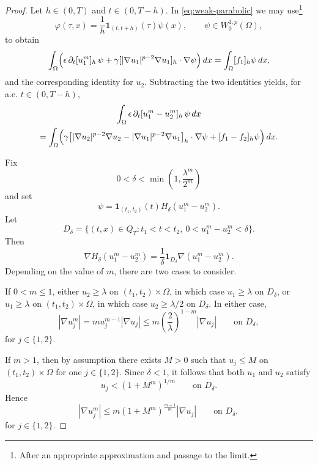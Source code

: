 \documentclass[a4paper,12pt]{article}
\theoremstyle{definition}
\theoremstyle{remark}
\begin{document}
\begin{proof}
Let $h\in(0,T)$ and $t\in(0,T-h)$. In \eqref{eq:weak-parabolic} we may use\footnote{After an appropriate approximation and passage to the limit.}
\[
\varphi(\tau,x)=\frac{1}{h}\mathbf{1}_{(t,t+h)}(\tau)\psi(x),
\qquad \psi\in W^{1,p}_0(\Omega),
\]
to obtain
\[
\int_\Omega\Bigl(\epsilon\,\partial_t[u_1^m]_h\,\psi+\gamma[|\nabla u_1|^{p-2}\nabla u_1]_h\cdot\nabla\psi\Bigr)\,dx
=\int_\Omega [f_1]_h\psi\,dx,
\]
and the corresponding identity for $u_2$. Subtracting the two identities yields, for a.e. $t\in(0,T-h)$,
\begin{multline}\label{eq:comparison-difference}
\int_\Omega\epsilon\,\partial_t[u_1^m-u_2^m]_h\,\psi\,dx\\
=\int_\Omega\Bigl(\gamma\bigl[|\nabla u_2|^{p-2}\nabla u_2-|\nabla u_1|^{p-2}\nabla u_1\bigr]_h\cdot\nabla\psi+[f_1-f_2]_h\psi\Bigr)\,dx.
\end{multline}

Fix
\[
0<\delta<\min\!\left(1,\frac{\lambda^m}{2^m}\right)
\]
and set
\[
\psi=\mathbf{1}_{(t_1,t_2)}(t)H_\delta(u_1^m-u_2^m).
\]
Let
\[
D_\delta=\{(t,x)\in Q_T:t_1<t<t_2,\ 0<u_1^m-u_2^m<\delta\}.
\]
Then
\[
\nabla H_\delta(u_1^m-u_2^m)=\frac{1}{\delta}\mathbf{1}_{D_\delta}\nabla(u_1^m-u_2^m).
\]
Depending on the value of $m$, there are two cases to consider.

If $0<m\le 1$, either $u_2\ge \lambda$ on $(t_1,t_2)\times\Omega$, in which case $u_1\ge \lambda$ on $D_\delta$, or $u_1\ge \lambda$ on $(t_1,t_2)\times\Omega$, in which case $u_2\ge \lambda/2$ on $D_\delta$. In either case,
\[
|\nabla u_j^m|=m u_j^{m-1}|\nabla u_j|\le m\left(\frac{2}{\lambda}\right)^{1-m}|\nabla u_j|
\qquad\text{on }D_\delta,
\]
for $j\in\{1,2\}$.

If $m>1$, then by assumption there exists $M>0$ such that $u_j\le M$ on $(t_1,t_2)\times\Omega$ for one $j\in\{1,2\}$. Since $\delta<1$, it follows that both $u_1$ and $u_2$ satisfy
\[u_j<(1+M^m)^{1/m}
\qquad\text{on }D_\delta.
\]
Hence
\[
|\nabla u_j^m|\le m(1+M^m)^{\frac{m-1}{m}}|\nabla u_j|
\qquad\text{on }D_\delta,
\]
for $j\in\{1,2\}$.


\end{proof}
\end{document}

